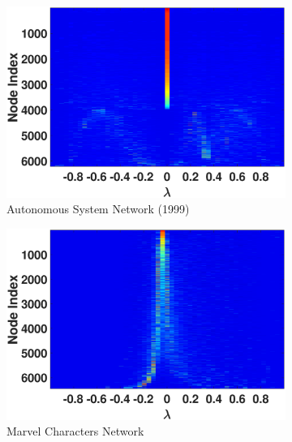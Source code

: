 \begin{figure}[ht]
\begin{subfigure}[t]{0.19\textwidth}
    \includegraphics[width=\textwidth,trim = .4cm 0.5cm 3.5cm 1.3cm,clip]
    {./ndos/pics/as19991115_ldos}
    \caption{Autonomous System Network (1999)}
    \label{fig:as_ldos}
  \end{subfigure}
  \begin{subfigure}[t]{0.19\textwidth}
    \centering  
    \captionsetup{justification=centering,font=scriptsize}
    \includegraphics[width=\textwidth,trim = .4cm 0.5cm 3.5cm 1.3cm,clip]
    {./ndos/pics/marvel_ldos}{}
    \caption{Marvel Characters Network}
    \label{fig:marvel_ldos}
  \end{subfigure}
  \begin{subfigure}[t]{0.19\textwidth}
    \centering  
    \captionsetup{justification=centering,font=scriptsize}

\end{subfigure}
\end{figure}
